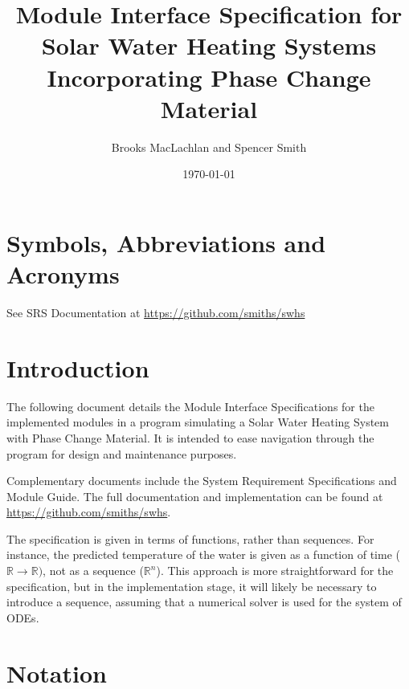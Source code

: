 \documentclass[12pt, titlepage]{article}
\begin{document}
\title{Module Interface Specification for Solar Water Heating Systems
  Incorporating Phase Change Material}

\author{Brooks MacLachlan and Spencer Smith}

\date{\today}

\maketitle


\section{Symbols, Abbreviations and Acronyms}

See SRS Documentation at \url{https://github.com/smiths/swhs}

\newpage

\tableofcontents

\newpage


\section{Introduction}

The following document details the Module Interface Specifications for the
implemented modules in a program simulating a Solar Water Heating System with
Phase Change Material.  It is intended to ease navigation through the program
for design and maintenance purposes.

Complementary documents include the System Requirement Specifications
and Module Guide.  The full documentation and implementation can be
found at \url{https://github.com/smiths/swhs}.

The specification is given in terms of functions, rather than sequences.  For
instance, the predicted temperature of the water is given as a function of time
($\mathbb{R} \rightarrow \mathbb{R})$, not as a sequence ($\mathbb{R}^n$).  This
approach is more straightforward for the specification, but in the
implementation stage, it will likely be necessary to introduce a
sequence, assuming that a numerical solver is used for the system of ODEs.

\section{Notation}
\end{document}
